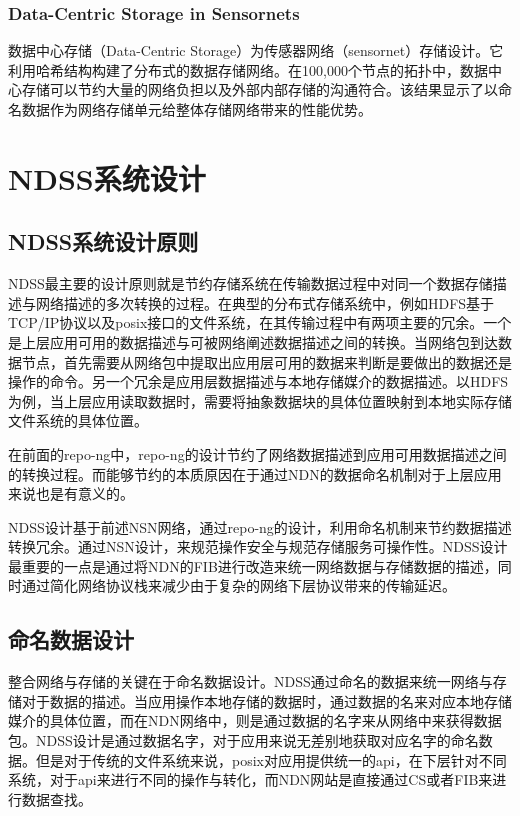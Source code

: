 \subsubsection{Data-Centric Storage in Sensornets}
数据中心存储（Data-Centric Storage）\cite{ratnasamy2002ght,shenker2003data}为传感器网络（sensornet）存储设计。它利用哈希结构构建了分布式的数据存储网络。在100,000个节点的拓扑中，数据中心存储可以节约大量的网络负担以及外部内部存储的沟通符合。该结果显示了以命名数据作为网络存储单元给整体存储网络带来的性能优势。

\section{NDSS系统设计}
\subsection{NDSS系统设计原则}
NDSS最主要的设计原则就是节约存储系统在传输数据过程中对同一个数据存储描述与网络描述的多次转换的过程。在典型的分布式存储系统中，例如HDFS基于TCP/IP协议以及posix接口的文件系统，在其传输过程中有两项主要的冗余。一个是上层应用可用的数据描述与可被网络阐述数据描述之间的转换。当网络包到达数据节点，首先需要从网络包中提取出应用层可用的数据来判断是要做出的数据还是操作的命令。另一个冗余是应用层数据描述与本地存储媒介的数据描述。以HDFS为例，当上层应用读取数据时，需要将抽象数据块的具体位置映射到本地实际存储文件系统的具体位置。

在前面的repo-ng中，repo-ng的设计节约了网络数据描述到应用可用数据描述之间的转换过程。而能够节约的本质原因在于通过NDN的数据命名机制对于上层应用来说也是有意义的。

NDSS设计基于前述NSN网络，通过repo-ng的设计，利用命名机制来节约数据描述转换冗余。通过NSN设计，来规范操作安全与规范存储服务可操作性。NDSS设计最重要的一点是通过将NDN的FIB进行改造来统一网络数据与存储数据的描述，同时通过简化网络协议栈来减少由于复杂的网络下层协议带来的传输延迟。

\subsection{命名数据设计}
整合网络与存储的关键在于命名数据设计。NDSS通过命名的数据来统一网络与存储对于数据的描述。当应用操作本地存储的数据时，通过数据的名来对应本地存储媒介的具体位置，而在NDN网络中，则是通过数据的名字来从网络中来获得数据包。NDSS设计是通过数据名字，对于应用来说无差别地获取对应名字的命名数据。但是对于传统的文件系统来说，posix对应用提供统一的api，在下层针对不同系统，对于api来进行不同的操作与转化，而NDN网站是直接通过CS或者FIB来进行数据查找。

